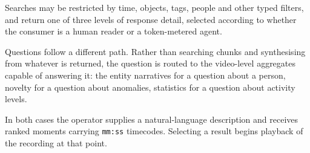 Searches may be restricted by time, objects, tags, people and other typed filters, and
return one of three levels of response detail, selected according to whether the
consumer is a human reader or a token-metered agent.

Questions follow a different path. Rather than searching chunks and synthesising from
whatever is returned, the question is routed to the video-level aggregates capable of
answering it: the entity narratives for a question about a person, novelty for a
question about anomalies, statistics for a question about activity levels.

In both cases the operator supplies a natural-language description and receives ranked
moments carrying \texttt{mm:ss} timecodes. Selecting a result begins playback of the
recording at that point.
